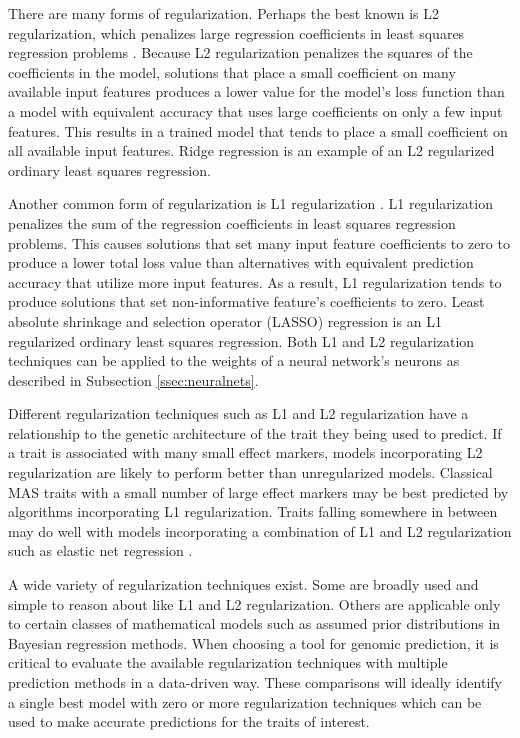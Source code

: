 There are many forms of regularization. Perhaps the best known is L2 regularization, 
which penalizes large regression coefficients in least squares regression 
problems \citep{tibshirani1996}. Because L2 regularization penalizes the squares of the coefficients 
in the model, solutions that place a small coefficient on many available input features 
produces a lower value for the model's loss function than a model with equivalent accuracy 
that uses large coefficients on only a few input features. This results in a trained
model that tends to place a small coefficient on all available input features.  Ridge regression
is an example of an L2 regularized ordinary least squares regression. 

Another common form of regularization is L1 regularization \citep{tibshirani1996}. 
L1 regularization penalizes the sum of the regression coefficients in least 
squares regression problems. This causes solutions that set many input feature 
coefficients to zero to produce a lower total loss value than alternatives 
with equivalent prediction accuracy that utilize more input features. 
As a result, L1 regularization tends to produce solutions that set non-informative 
feature's coefficients to zero. Least absolute shrinkage and selection operator 
(LASSO) regression is an L1 regularized ordinary least squares regression. Both L1 and L2
regularization techniques can be applied to the weights of a neural network's neurons
as described in Subsection \ref{ssec:neuralnets}.

Different regularization techniques such as L1 and L2 regularization have a relationship
to the genetic architecture of the trait they being used to predict. If a trait is associated 
with many small effect markers, models incorporating L2 regularization are likely 
to perform better than unregularized models. Classical MAS traits with a small 
number of large effect markers may be best predicted by algorithms 
incorporating L1 regularization. Traits falling somewhere in between may do well 
with models incorporating a combination of L1 and L2 regularization such as
elastic net regression \citep{zou2005}.

A wide variety of regularization techniques exist. Some are broadly used and simple
to reason about like L1 and L2 regularization. Others are applicable only to certain 
classes of mathematical models such as assumed prior distributions in Bayesian
regression methods. When choosing a tool for genomic prediction, it is critical to evaluate 
the available regularization techniques with multiple prediction methods in a data-driven way.
These comparisons will ideally identify a single best model with zero or more regularization techniques 
which can be used to make accurate predictions for the traits of interest. 


